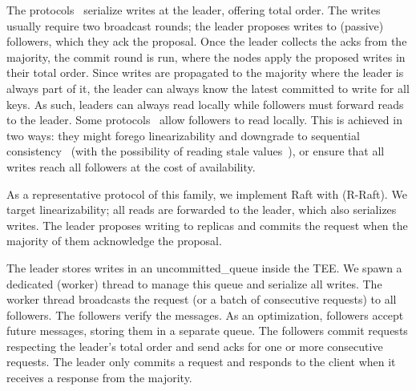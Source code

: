 The protocols~\cite{raft, Reed2008AST, 10.1145/2673577} serialize writes at the leader, offering total order. The writes usually require two broadcast rounds; the leader proposes writes to (passive)
followers, which they ack the proposal. Once the leader collects the acks from the majority, the commit round is run, where the nodes apply the proposed writes in their total order.
Since writes are propagated to the majority where the leader is always part of it, the leader can always know the latest committed to write for all keys. As such, leaders can always read locally while followers must forward reads to the leader. 
Some protocols~\cite{Reed2008AST} allow followers to read locally. This is achieved in two ways: they might forego linearizability and downgrade to sequential consistency~\cite{attiya:1991} (with the possibility of reading stale values~\cite{Reed2008AST}), or ensure that all writes reach all followers at the cost of availability.

 As a representative protocol of this family, we implement Raft with \projecttitle{} (R-Raft). We target linearizability; all reads are forwarded to the leader, which also serializes writes. The leader proposes writing to replicas and commits the request when the majority of them acknowledge the proposal.



The leader stores writes in an uncommitted\_queue inside the TEE. We spawn a dedicated (worker) thread to manage this queue and serialize all writes. The worker thread broadcasts the request (or a batch of consecutive requests) to all followers. The followers verify the messages. As an optimization, followers accept future messages, storing them in a separate queue. The followers commit requests respecting the leader's total order and send acks for one or more consecutive requests. The leader only commits a request and responds to the client when it receives a response from the majority. %









